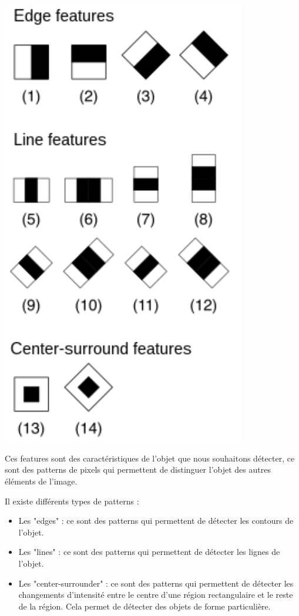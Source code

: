 \documentclass[11pt]{article}
\begin{document}
\begin{minipage}[t]{0.45\textwidth}
    \begin{center}
        \includegraphics[width=0.8\textwidth]{images/haar_feature_2.jpg}
        \label{fig:haar_features_2}
    \end{center}
\end{minipage}

\bigbreak \bigbreak


Ces features sont des caractéristiques de l'objet que nous souhaitons détecter, ce sont des patterns de pixels qui permettent de distinguer l'objet des autres éléments de l'image.

\noindent Il existe différents types de patterns :
\begin{itemize}[label=-]
    \item Les "edges" : ce sont des patterns qui permettent de détecter les contours de l'objet.
    \item Les "lines" : ce sont des patterns qui permettent de détecter les lignes de l'objet.
    \item Les "center-surrounder" : ce sont des patterns qui permettent de détecter les changements d'intensité entre le centre d'une région rectangulaire et le reste de la région. Cela permet de détecter des objets de forme particulière.
\end{itemize}
\end{document}
